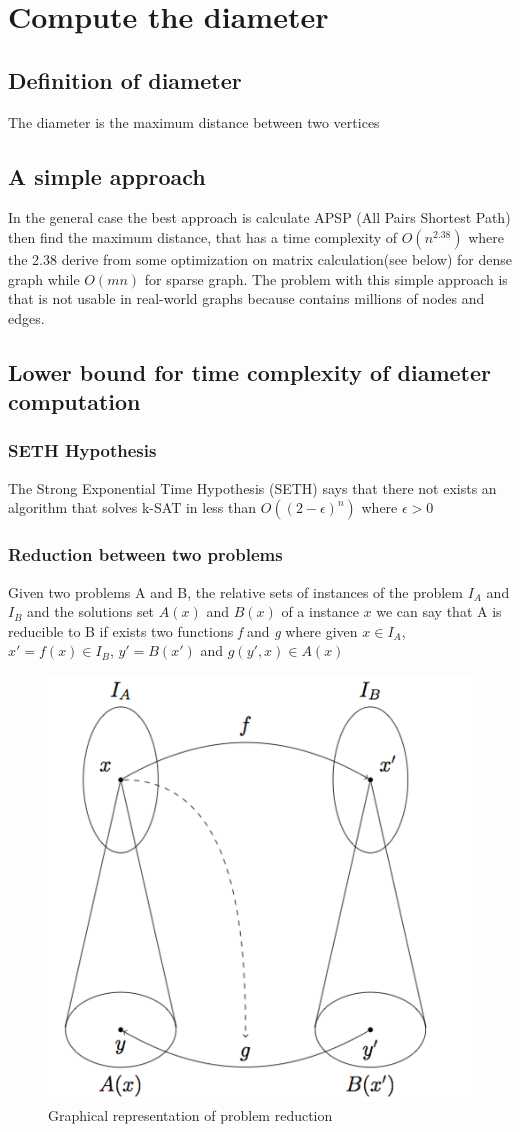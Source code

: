 \chapter{Compute the diameter}
\section{Definition of diameter}
The diameter is the maximum distance between two vertices
\section{A simple approach}
In the general case the best approach is calculate APSP (All Pairs Shortest Path) then find the maximum distance, that has a time complexity of $ O(n^{2.38}) $ where the 2.38 derive from some optimization on matrix calculation(see below) for dense graph while $ O(mn) $ for sparse graph. The problem with this simple approach is that is not usable in real-world graphs because contains millions of nodes and edges.
\section{Lower bound for time complexity of diameter computation}
\subsection{SETH Hypothesis}
The Strong Exponential Time Hypothesis (SETH) says that there not exists an algorithm that solves k-SAT in less than $ O((2-\epsilon)^n) $ where $ \epsilon > 0 $
\subsection{Reduction between two problems}
Given two problems A and B, the relative sets of instances of the problem $ I_A $ and $ I_B $ and the solutions set $ A(x) $ and $ B(x) $ of a instance $ x $ we can say that A is reducible to B if exists two functions \textit{f} and \textit{g} where given $ x \in I_A $, $ x' = f(x) \in I_B $, $ y' = B(x') $ and $ g(y', x) \in A(x) $

\begin{figure}[H]
	\centering
	\includegraphics[width=0.7\linewidth]{img/problem_reduction}
	\caption{Graphical representation of problem reduction}
	\label{fig:problemreduction}
\end{figure}
